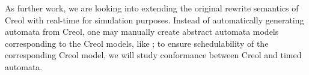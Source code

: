 \documentclass[copyright,creativecommons]{eptcs}
\theoremstyle{definition}
\begin{document}
As further work, we are  looking into extending the original rewrite semantics of Creol with real-time for simulation purposes.
Instead of automatically generating automata from Creol, one may manually create abstract automata models corresponding to the Creol models, like \cite{BoerGJSY09}; to ensure schedulability of the corresponding Creol model, we will study conformance between Creol and timed automata.





\end{document}
